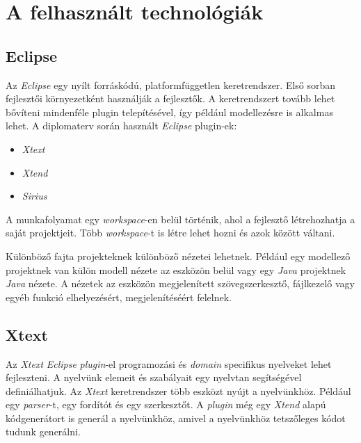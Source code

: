 \clearpage\section{A felhasznált technológiák}
\subsection{Eclipse}

Az \textit{Eclipse} \cite{Eclipse} egy nyílt forráskódú, platformfüggetlen keretrendszer.
Első sorban fejlesztői környezetként használják a fejlesztők.
A keretrendszert tovább lehet bővíteni mindenféle plugin telepítésével, így például modellezésre is alkalmas lehet.
A diplomaterv során használt \textit{Eclipse} plugin-ek:

\begin{itemize}
    \item \textit{Xtext}
    \item \textit{Xtend}
    \item \textit{Sirius}
\end{itemize}

A munkafolyamat egy \textit{workspace}-en belül történik, ahol a fejlesztő létrehozhatja a saját projektjeit.
Több \textit{workspace}-t is létre lehet hozni és azok között váltani.

Különböző fajta projekteknek különböző nézetei lehetnek.
Például egy modellező projektnek van külön modell nézete az eszközön belül vagy egy \textit{Java} projektnek \textit{Java} nézete.
A nézetek az eszközön megjelenített szövegszerkesztő, fájlkezelő vagy egyéb funkció elhelyezésért, megjelenítéséért felelnek.

\subsection{Xtext}

Az \textit{Xtext} \cite{Xtext} \textit{Eclipse} \textit{plugin}-el programozási és \textit{domain} specifikus nyelveket lehet fejleszteni.
A nyelvünk elemeit és szabályait egy nyelvtan segítségével definiálhatjuk.
Az \textit{Xtext} keretrendszer több eszközt nyújt a nyelvünkhöz.
Például egy \textit{parser}-t, egy fordítót és egy szerkesztőt.
A \textit{plugin} még egy \textit{Xtend} alapú kódgenerátort is generál a nyelvünkhöz, amivel a nyelvünkhöz tetszőleges kódot tudunk generálni.

